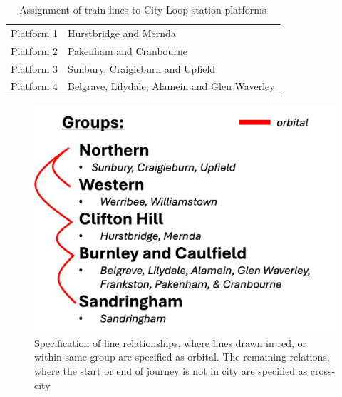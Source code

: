 \begin{table}[ht]
    \centering
      \caption{Assignment of train lines to City Loop station platforms}
    \begin{tabular}{c|l}
         Platform 1& Hurstbridge and Mernda \\
         Platform 2& Pakenham and Cranbourne\\
         Platform 3& Sunbury, Craigieburn and Upfield\\
         Platform 4& Belgrave, Lilydale, Alamein and Glen Waverley\\
    \end{tabular}

    \label{tab:cityloop_platforms}
\end{table}

\begin{figure}[ht]
    \centering
    \includegraphics[width=0.75\linewidth]{images/Case_Study/Appendix/orbitalgroupsss.png}
    \caption[Specification of train line relationships]{Specification of line relationships, where lines drawn in red, or within same group are specified as orbital. The remaining relations, where the start or end of journey is not in city are specified as cross-city}
    \label{fig:enter-label}
\end{figure}